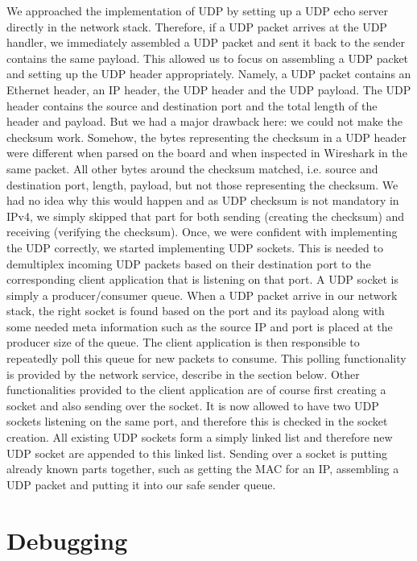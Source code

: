 We approached the implementation of UDP by setting up a UDP echo server directly
in the network stack. Therefore, if a UDP packet arrives at the UDP handler, we
immediately assembled a UDP packet and sent it back to the sender contains the
same payload. This allowed us to focus on assembling a UDP packet and setting up
the UDP header appropriately. Namely, a UDP packet contains an Ethernet header,
an IP header, the UDP header and the UDP payload. The UDP header contains the
source and destination port and the total length of the header and payload.  But
we had a major drawback here: we could not make the checksum work. Somehow, the
bytes representing the checksum in a UDP header were different when parsed on
the board and when inspected in Wireshark in the same packet. All other bytes
around the checksum matched, i.e. source and destination port, length, payload,
but not those representing the checksum. We had no idea why this would happen
and as UDP checksum is not mandatory in IPv4, we simply skipped that part for
both sending (creating the checksum) and receiving (verifying the checksum).
Once, we were confident with implementing the UDP correctly, we started
implementing UDP sockets. This is needed to demultiplex incoming UDP packets
based on their destination port to the corresponding client application that is
listening on that port.  A UDP socket is simply a producer/consumer queue. When
a UDP packet arrive in our network stack, the right socket is found based on the
port and its payload along with some needed meta information such as the source
IP and port is placed at the producer size of the queue. The client application
is then responsible to repeatedly poll this queue for new packets to consume.
This polling functionality is provided by the network service, describe in the
section below.  Other functionalities provided to the client application are of
course first creating a socket and also sending over the socket. It is now
allowed to have two UDP sockets listening on the same port, and therefore this
is checked in the socket creation. All existing UDP sockets form a simply linked
list and therefore new UDP socket are appended to this linked list. Sending over
a socket is putting already known parts together, such as getting the MAC for an
IP, assembling a UDP packet and putting it into our safe sender queue.

\section{Debugging}

